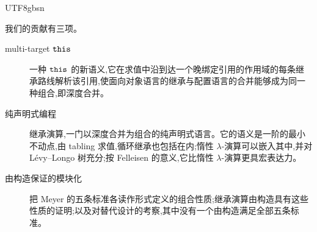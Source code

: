 \begin{CJK*}{UTF8}{gbsn}


\ifPaperChinese
我们的贡献有三项。
\begin{description}
  \item[multi-target $\mathtt{this}$] 一种 $\mathtt{this}$ 的新语义,它在求值中沿到达一个晚绑定引用的作用域的每条继承路线解析该引用,使面向对象语言的继承与配置语言的合并能够成为同一种组合,即深度合并。
  \item[纯声明式编程] 继承演算,一门以深度合并为组合的纯声明式语言。它的语义是一阶的最小不动点,由 tabling 求值,循环继承也包括在内;惰性 $\lambda$-演算可以嵌入其中,并对 Lévy--Longo 树充分;按 Felleisen 的意义,它比惰性 $\lambda$-演算更具宏表达力。
  \item[由构造保证的模块化] 把 Meyer 的五条标准各读作形式定义的组合性质;继承演算由构造具有这些性质的证明;以及对替代设计的考察,其中没有一个由构造满足全部五条标准。

\end{description}
\end{CJK*}
